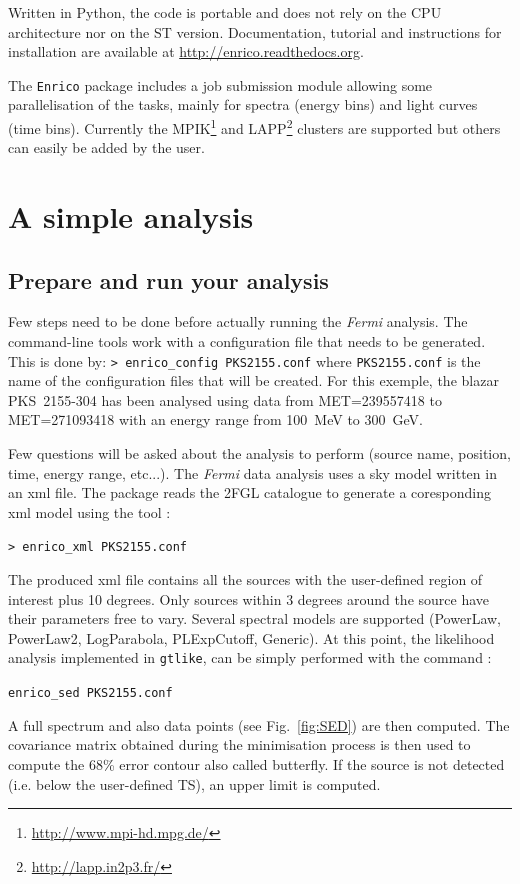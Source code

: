 \documentclass[a4paper]{article}
\newcommand{\Fermi}{\textit{Fermi} }
\begin{document}
Written in Python, the code is portable and does not rely on the CPU
architecture nor on the ST version. Documentation, tutorial and instructions for
installation are available at \url{http://enrico.readthedocs.org}. 

The {\tt Enrico} package includes a job submission module allowing some
parallelisation of the tasks, mainly for spectra (energy bins) and light curves
(time bins). Currently the MPIK\footnote{\url{http://www.mpi-hd.mpg.de/}} and
LAPP\footnote{\url{http://lapp.in2p3.fr/}} clusters are supported but others can
easily be added by the user.

\section{A simple analysis}

\subsection{Prepare and run your analysis}

Few steps need to be done before actually running the \Fermi analysis. The
command-line tools work with a configuration file that needs to be generated.
This is done by:
\mbox{{\tt> enrico\_config PKS2155.conf}} 
where {\tt PKS2155.conf} is the name of the configuration files that will be
created. For this exemple, the blazar PKS~2155-304 has been analysed using data
from MET=239557418 to MET=271093418 with an energy range from 100~MeV to
300~GeV.

Few questions will be asked about the analysis to perform (source name,
position, time, energy range, etc...). The \Fermi data analysis uses a sky model
written in an xml file. The package reads the 2FGL catalogue
\cite{2012ApJS..199...31N} to generate a coresponding xml model using the tool :

\mbox{{\tt> enrico\_xml PKS2155.conf}}

The produced xml file contains all the sources with the user-defined region of
interest plus 10 degrees. Only sources within 3 degrees around the source have
their parameters free to vary. Several spectral models are supported (PowerLaw,
PowerLaw2, LogParabola, PLExpCutoff, Generic). At this point, the likelihood
analysis implemented in {\tt gtlike}, can be simply performed with the command :

\mbox{{\tt enrico\_sed PKS2155.conf}}

A full spectrum and also data points (see Fig.~\ref{fig:SED}) are then computed.
The covariance matrix obtained during the minimisation process is then used to
compute the 68\% error contour also called butterfly. If the source is not
detected (i.e. below the user-defined TS), an upper limit is computed.
\end{document}
